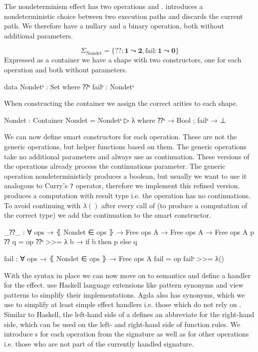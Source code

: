 The nondeterminism effect has two operations  and
.
 introduces a nondeterministic choice between two execution
paths and  discards the current path.
We therefore have a nullary and a binary operation, both without additional
parameters.

$$
\Sigma_{\text{Nondet}} = \{ ?\!? : \mathbf{1} \leadsto \mathbf{2}, \mathrm{fail}
: \mathbf{1} \leadsto \mathbf{0} \}
$$
Expressed as a container we have a shape with two constructors, one for each
operation and both without parameters.

\begin{code}
data Nondetˢ : Set where ⁇ˢ failˢ : Nondetˢ
\end{code}
When constructing the container we assign the correct arities to each shape.

\begin{code}
Nondet : Container
Nondet = Nondetˢ ▷ λ where ⁇ˢ → Bool ; failˢ → ⊥
\end{code}
We can now define smart constructors for each operation.
These are not the generic operations, but helper functions based on them.
The generic operations take no additional parameters and always use
 as continuation.
These versions of the operations already process the continuations parameter.
The generic  operation nondeterministicly produces a boolean,
but usually we want to use it analogous to Curry's \texttt{?} operator,
therefore we implement this refined version.
\AgdaSpace{} produces a
computation with result type  i.e. the operation has no
continuations.
To avoid continuing with $λ()$ after every call of  (to
produce a computation of the correct type) we add the continuation to the smart
constructor.

\begin{code}
_⁇_ : ∀ {ops} → ⦃ Nondet ∈ ops ⦄ → Free ops A → Free ops A → Free ops A
p ⁇ q = op ⁇ˢ >>= λ b → if b then p else q

fail : ∀ {ops} → ⦃ Nondet ∈ ops ⦄ → Free ops A
fail = op failˢ >>= λ()
\end{code}
With the syntax in place we can now move on to semantics and define a handler
for the effect.
\textcite{DBLP:conf/haskell/WuSH14} use Haskell language extensions like pattern
synonyms and view patterns to simplify their implementations.
Agda also has  synonyms, which we use to simplify at least
simple effect handlers i.e. those which do not rely on .
Similar to Haskell, the left-hand side of a  defines an
abbreviate for the right-hand side, which can be used on the left- and
right-hand side of function rules.
We introduce s for each operation from the signature as
well as for other operations i.e. those who are not part of the currently
handled signature.

